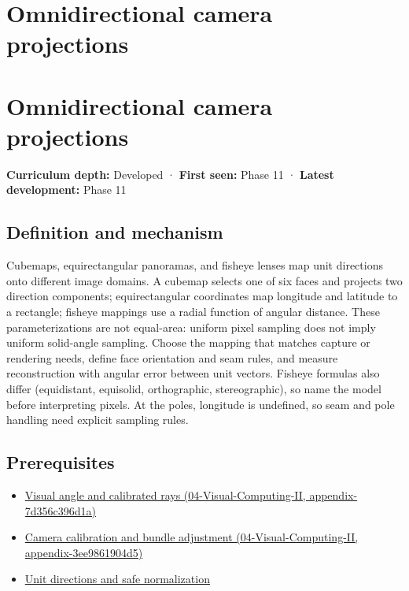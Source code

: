 \hypertarget{appendix-fc99ad39f351}{}
\section*{Omnidirectional camera projections}
\section{Omnidirectional camera projections}\label{omnidirectional-camera-projections}

\textbf{Curriculum depth:} Developed · \textbf{First seen:} Phase 11 · \textbf{Latest development:} Phase 11

\subsection{Definition and mechanism}\label{definition-and-mechanism}

Cubemaps, equirectangular panoramas, and fisheye lenses map unit directions onto different image domains. A cubemap selects one of six faces and projects two direction components; equirectangular coordinates map longitude and latitude to a rectangle; fisheye mappings use a radial function of angular distance. These parameterizations are not equal-area: uniform pixel sampling does not imply uniform solid-angle sampling. Choose the mapping that matches capture or rendering needs, define face orientation and seam rules, and measure reconstruction with angular error between unit vectors. Fisheye formulas also differ (equidistant, equisolid, orthographic, stereographic), so name the model before interpreting pixels. At the poles, longitude is undefined, so seam and pole handling need explicit sampling rules.

\subsection{Prerequisites}\label{prerequisites}

\begin{itemize}
\tightlist
\item
  \href{}{Visual angle and calibrated rays (04-Visual-Computing-II, appendix-7d356c396d1a)}
\item
  \href{}{Camera calibration and bundle adjustment (04-Visual-Computing-II, appendix-3ee9861904d5)}
\item
  \hyperref[appendix-f744e41b95b4]{Unit directions and safe normalization}
\end{itemize}

